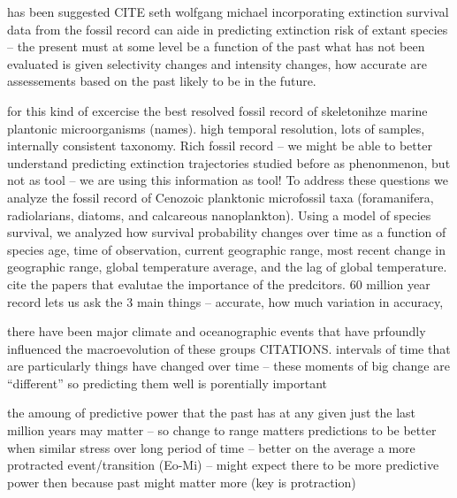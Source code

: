 \documentclass[12pt,letterpaper]{article}
\begin{document}
has been suggested CITE seth wolfgang michael
incorporating extinction survival data from the fossil record can aide in predicting extinction risk of extant species -- the present must at some level be a function of the past
what has not been evaluated is given selectivity changes and intensity changes, how accurate are assessements based on the past likely to be in the future.





for this kind of excercise the best resolved fossil record of skeletonihze marine plantonic microorganisms (names). high temporal resolution, lots of samples, internally consistent taxonomy. 
Rich fossil record -- we might be able to better understand predicting extinction 
trajectories studied before as phenonmenon, but not as tool -- we are using this information as tool!
To address these questions we analyze the fossil record of Cenozoic planktonic microfossil taxa (foramanifera, radiolarians, diatoms, and calcareous nanoplankton). Using a model of species survival, we analyzed how survival probability changes over time as a function of species age, time of observation, current geographic range, most recent change in geographic range, global temperature average, and the lag of global temperature. 
cite the papers that evalutae the importance of the predcitors.
60 million year record lets us ask the 3 main things -- accurate, how much variation in accuracy, 


there have been major climate and oceanographic events that have prfoundly influenced the macroevolution of these groups CITATIONS.
intervals of time that are particularly 
things have changed over time -- these moments of big change are ``different'' so predicting them well is porentially important

the amoung of predictive power that the past has at any given 
just the last million years may matter -- so change to range matters
predictions to be better when similar stress over long period of time -- better on the average
a more protracted event/transition (Eo-Mi) -- might expect there to be more predictive power then because past might matter more (key is protraction)
\end{document}

